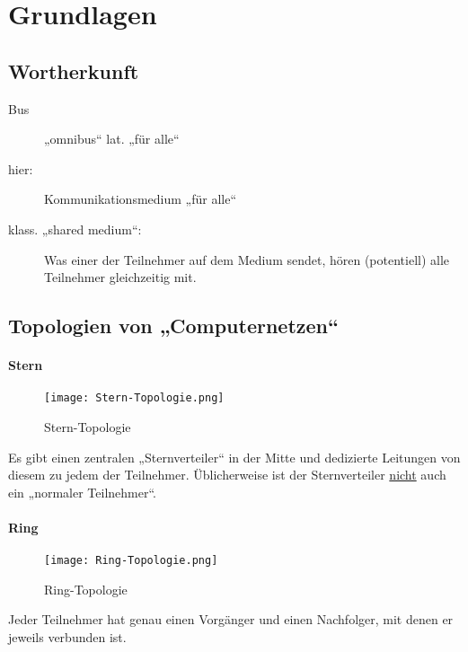 \chapter{Grundlagen}



\section{Wortherkunft}
\label{sec:wortherkunft}

\begin{description}
\item[Bus] „omnibus“ lat. „für alle“
\item[hier:] Kommunikationsmedium „für alle“
\item[klass. „shared medium“:] Was einer der Teilnehmer auf dem Medium sendet, hören (potentiell) alle Teilnehmer gleichzeitig mit.
\end{description}



\section{Topologien von „Computernetzen“}
\label{sec:topologien}

\subsubsection{Stern}
\begin{figure}[htbp]
  \centering
  \texttt{[image: Stern-Topologie.png]}
  \caption{Stern-Topologie}
\end{figure}
Es gibt einen zentralen „Sternverteiler“ in der Mitte und dedizierte Leitungen von diesem zu jedem der Teilnehmer. Üblicherweise ist der Sternverteiler \underline{nicht} auch ein „normaler Teilnehmer“.\\

\subsubsection{Ring}
\begin{figure}[htbp]
  \centering
  \texttt{[image: Ring-Topologie.png]}
  \caption{Ring-Topologie}
\end{figure}
Jeder Teilnehmer hat genau einen Vorgänger und einen Nachfolger, mit denen er jeweils verbunden ist.

